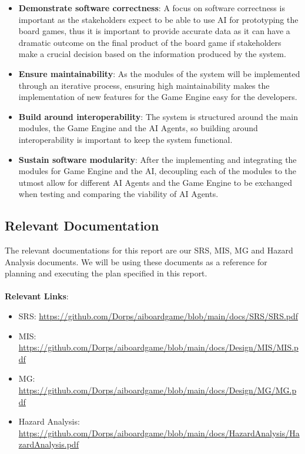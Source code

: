 \documentclass[12pt, titlepage]{article}
\begin{document}
\begin{itemize}
    \item \textbf{Demonstrate software correctness}: A focus on software correctness is important as the stakeholders expect to be able to use AI for prototyping the board games, thus it is important to provide accurate data as it can have a dramatic outcome on the final product of the board game if stakeholders make a crucial decision based on the information produced by the system.
    \item \textbf{Ensure maintainability}: As the modules of the system will be implemented through an iterative process, ensuring high maintainability makes the implementation of new features for the Game Engine easy for the developers.
    \item \textbf{Build around interoperability}: The system is structured around the main modules, the Game Engine and the AI Agents, so building around interoperability is important to keep the system functional.
    \item \textbf{Sustain software modularity}: After the implementing and integrating the modules for Game Engine and the AI, decoupling each of the modules to the utmost allow for different AI Agents and the Game Engine to be exchanged when testing and comparing the viability of AI Agents. 
\end{itemize}


\subsection{Relevant Documentation}

The relevant documentations for this report are our SRS, MIS, MG and Hazard Analysis documents. We will be using these documents as a reference for planning and executing the plan specified in this report. 
\\\\
\textbf{Relevant Links}:
\begin{itemize}
    \item SRS: \url{https://github.com/Dorps/aiboardgame/blob/main/docs/SRS/SRS.pdf}
    \item MIS: \url{https://github.com/Dorps/aiboardgame/blob/main/docs/Design/MIS/MIS.pdf}
    \item MG: \url{https://github.com/Dorps/aiboardgame/blob/main/docs/Design/MG/MG.pdf}
    \item Hazard Analysis: \url{https://github.com/Dorps/aiboardgame/blob/main/docs/HazardAnalysis/HazardAnalysis.pdf}
\end{itemize}
\end{document}
